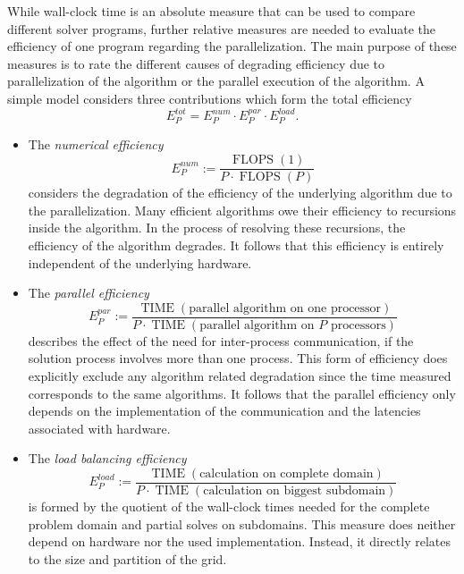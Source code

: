While wall-clock time is an absolute measure that can be used to compare different solver programs, further relative measures are needed to evaluate the efficiency of one program regarding the parallelization. The main purpose of these measures is to rate the different causes of degrading efficiency due to parallelization of the algorithm or the parallel execution of the algorithm. A simple model \cite{ferziger02,schaefer99} considers three contributions which form the total efficiency
\begin{equation}
  \label{eq:efficiency}
  E^{tot}_P = E^{num}_P \cdot E^{par}_P \cdot E^{load}_P.
\end{equation}
\begin{itemize}
  \item[] The \emph{numerical efficiency}
  \begin{displaymath} E^{num}_P := \frac{\operatorname{FLOPS}(1)}{P \cdot \operatorname{FLOPS}(P)}\end{displaymath} 
    considers the degradation of the efficiency of the underlying algorithm due to the parallelization. Many efficient algorithms owe their efficiency to recursions inside the algorithm. In the process of resolving these recursions, the efficiency of the algorithm degrades. It follows that this efficiency is entirely independent of the underlying hardware.
  \item[] The \emph{parallel efficiency}
    \begin{displaymath} E^{par}_P :=\frac{\operatorname{TIME}(\text{parallel algorithm on one processor})}{P \cdot \operatorname{TIME}(\text{parallel algorithm on \(P\) processors})} \end{displaymath} 
      describes the effect of the need for inter-process communication, if the solution process involves more than one process. This form of efficiency does explicitly exclude any algorithm related degradation since the time measured corresponds to the same algorithms. It follows that the parallel efficiency only depends on the implementation of the communication and the latencies associated with hardware.
  \item[] The \emph{load balancing efficiency} 
    \begin{displaymath} E^{load}_P :=\frac{\operatorname{TIME}(\text{calculation on complete domain})}{P \cdot \operatorname{TIME}(\text{calculation on biggest subdomain})} \end{displaymath}
       is formed by the quotient of the wall-clock times needed for the complete problem domain and partial solves on subdomains. This measure does neither depend on hardware nor the used implementation. Instead, it directly relates to the size and partition of the grid. 
\end{itemize}


